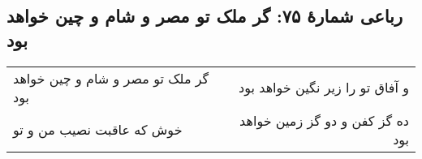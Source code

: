 \begin{center}
\section*{رباعی شمارهٔ ۷۵: گر ملک تو مصر و شام و چین خواهد بود}
\label{sec:075}
\begin{longtable}{l p{0.5cm} r}
گر ملک تو مصر و شام و چین خواهد بود
&&
و آفاق تو را زیر نگین خواهد بود 
\\
خوش که عاقبت نصیب من و تو 
&&
ده گز کفن و دو گز زمین خواهد بود
\\
\end{longtable}
\end{center}
